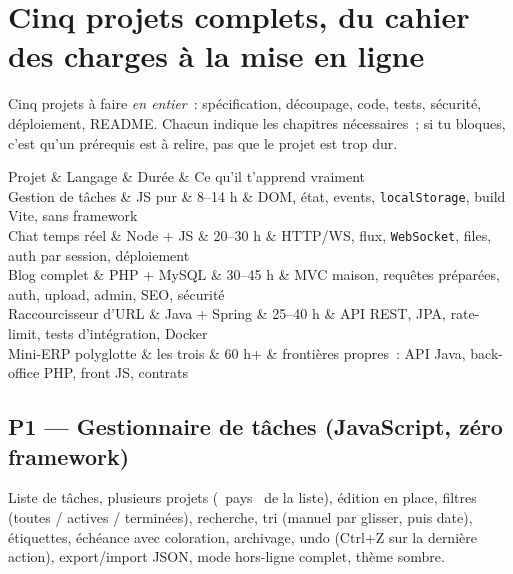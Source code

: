 \chapter{Cinq projets complets, du cahier des charges \`a la mise en ligne}
\label{ch-projets}

Cinq projets \`a faire \emph{en entier}~: sp\'ecification, d\'ecoupage, code, tests, s\'ecurit\'e,
d\'eploiement, README. Chacun indique les chapitres n\'ecessaires~; si tu bloques, c'est qu'un
pr\'erequis est \`a relire, pas que le projet est trop dur.

\begin{tablez}
  \headrow Projet \& Langage \& Dur\'ee \& Ce qu'il t'apprend vraiment \\
  \midrule
   Gestion de t\^aches \& JS pur \& 8--14 h \& DOM, \'etat, events, \verb|localStorage|, build Vite, sans framework \\
   Chat temps r\'eel \& Node + JS \& 20--30 h \& HTTP/WS, flux, \verb|WebSocket|, files, auth par session, d\'eploiement \\
   Blog complet \& PHP + MySQL \& 30--45 h \& MVC maison, requ\^etes pr\'epar\'ees, auth, upload, admin, SEO, s\'ecurit\'e \\
   Raccourcisseur d'URL \& Java + Spring \& 25--40 h \& API REST, JPA, rate-limit, tests d'int\'egration, Docker \\
   Mini-ERP polyglotte \& les trois \& 60 h+ \& fronti\`eres propres~: API Java, back-office PHP, front JS, contrats \\
\end{tablez}

\section{P1 --- Gestionnaire de t\^aches (JavaScript, z\'ero framework)}

Liste de t\^aches, plusieurs projets (\og ~pays~ \fg{} de la liste), \'edition en place, filtres
(toutes / actives / termin\'ees), recherche, tri (manuel par glisser, puis date), \'etiquettes,
\'ech\'eance avec coloration, archivage, undo (Ctrl+Z sur la derni\`ere action), export/import JSON,
mode hors-ligne complet, th\`eme sombre.

